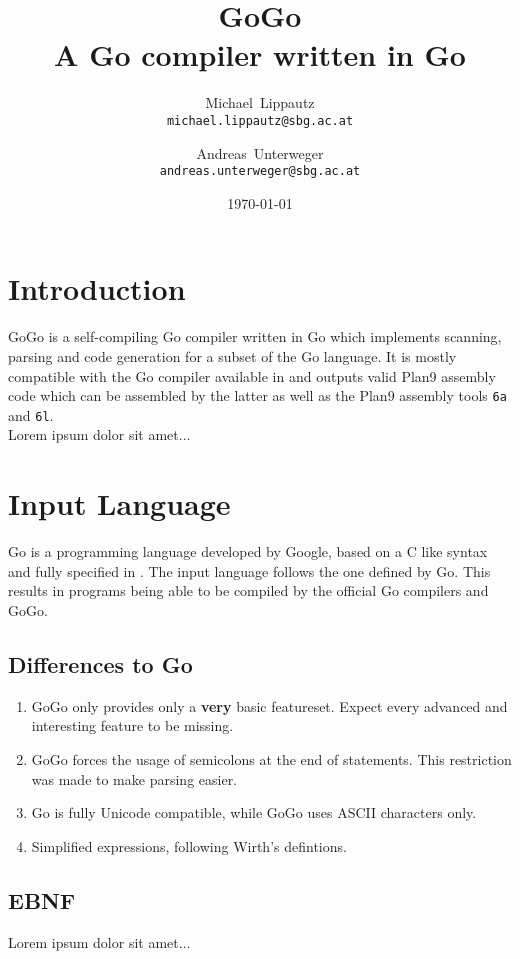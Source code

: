 \documentclass[a4paper]{scrreprt}
\title{GoGo\\ \large{A Go compiler written in Go}}
\author{
  Michael~Lippautz \\ \normalsize{\texttt{michael.lippautz@sbg.ac.at}} 
    \and 
  Andreas~Unterweger \\ \normalsize{\texttt{andreas.unterweger@sbg.ac.at}} 
}
\date{\today}
\begin{document}
  \maketitle
  \tableofcontents

  \chapter{Introduction}
    GoGo is a self-compiling Go compiler written in Go which implements scanning, parsing and code generation for a subset of the Go language\cite{goo10}. It is mostly compatible with the Go compiler available in \cite{goo10} and outputs valid Plan9 assembly code which can be assembled by the latter as well as the Plan9 assembly tools \texttt{6a} and \texttt{6l}\cite{pik00}.\\
    Lorem ipsum dolor sit amet...

  \chapter{Input Language}
    Go is a programming language developed by Google, based on a C like syntax and fully specified in \cite{goo10}. The input language follows the one defined by Go. This results in programs being able to be compiled by the official Go compilers and GoGo.

    \section{Differences to Go}
      \begin{enumerate}
        \item GoGo only provides only a \textbf{very} basic featureset. Expect every advanced and interesting feature to be missing.
        \item GoGo forces the usage of semicolons at the end of statements. This restriction was made to make parsing easier.
        \item Go is fully Unicode compatible, while GoGo uses ASCII characters only.
        \item Simplified expressions, following Wirth's \cite{wir96} defintions.
      \end{enumerate}

    \section{EBNF}
    \label{sec:ebnf}
      Lorem ipsum dolor sit amet...
\end{document}
